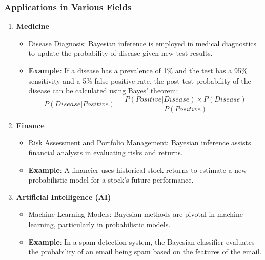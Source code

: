\documentclass[aspectratio=169]{beamer}
\begin{document}
\begin{frame}[fragile]
  \frametitle{Applications in Various Fields}
  
  \begin{enumerate}
    \item \textbf{Medicine}
      \begin{itemize}
        \item Disease Diagnosis: Bayesian inference is employed in medical diagnostics to update the probability of disease given new test results.
        \item \textbf{Example}: If a disease has a prevalence of 1\% and the test has a 95\% sensitivity and a 5\% false positive rate, the post-test probability of the disease can be calculated using Bayes' theorem:
        \begin{equation}
        P(Disease|Positive) = \frac{P(Positive|Disease) \times P(Disease)}{P(Positive)}
        \end{equation}
      \end{itemize}
    
    \item \textbf{Finance}
      \begin{itemize}
        \item Risk Assessment and Portfolio Management: Bayesian inference assists financial analysts in evaluating risks and returns.
        \item \textbf{Example}: A financier uses historical stock returns to estimate a new probabilistic model for a stock's future performance.
      \end{itemize}
    
    \item \textbf{Artificial Intelligence (AI)}
      \begin{itemize}
        \item Machine Learning Models: Bayesian methods are pivotal in machine learning, particularly in probabilistic models.
        \item \textbf{Example}: In a spam detection system, the Bayesian classifier evaluates the probability of an email being spam based on the features of the email.
      \end{itemize}
  \end{enumerate}
\end{frame}
\end{document}
